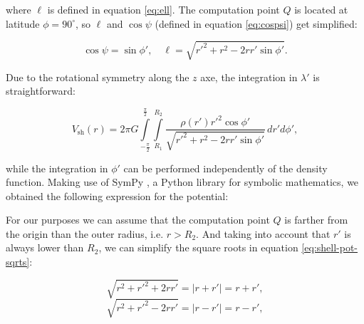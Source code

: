 \documentclass[extra]{gji}
\begin{document}
\noindent where $\ell$ is defined in equation \ref{eq:ell}.
The computation point $Q$ is located at latitude $\phi=90^\circ$, so 
$\ell$ and $\cos\psi$ (defined in equation \ref{eq:cospsi}) get 
simplified:

\begin{equation}
    \cos\psi = \sin\phi', \quad
    \ell = \sqrt{r'^2 + r^2 - 2 r r' \sin\phi'}.
\end{equation}

Due to the rotational symmetry along the $z$ axe, the integration in 
$\lambda'$ is straightforward:

\begin{equation}
    V_\text{sh}(r) = 2\pi G 
    \int\limits_{-\frac{\pi}{2}}^\frac{\pi}{2}
    \int\limits_{R_1}^{R_2}
    \frac{\rho(r') {r'}^2 \cos\phi'}{\sqrt{r'^2 + r^2 - 2 r r' \sin\phi'}}
    \, dr' d\phi',
\end{equation}

\noindent while the integration in $\phi'$ can be performed 
independently of the density function.
Making use of SymPy \citep{sympy2017}, a Python library for symbolic 
mathematics, we obtained the following expression for the potential:


For our purposes we can assume that the computation point $Q$ is 
farther from the origin than the outer radius, i.e. $r>R_2$. 
And taking into account that $r'$ is always lower than $R_2$, we can 
simplify the square roots in equation \ref{eq:shell-pot-sqrts}:

\begin{equation}
    \sqrt{r^2 + r'^2 + 2rr'} = |r + r'| = r + r',
\end{equation}
\begin{equation}
    \sqrt{r^2 + r'^2 - 2rr'} = |r - r'| = r - r',
\end{equation}
\end{document}

